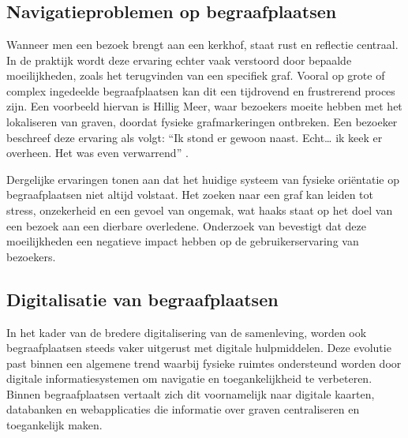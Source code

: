 \chapter{}%
\label{ch:stand-van-zaken}



\section{Navigatieproblemen op begraafplaatsen}

Wanneer men een bezoek brengt aan een kerkhof, staat rust en reflectie centraal. In de praktijk wordt deze ervaring echter vaak verstoord door bepaalde moeilijkheden, zoals het terugvinden van een specifiek graf. Vooral op grote of complex ingedeelde begraafplaatsen kan dit een tijdrovend en frustrerend proces zijn. Een voorbeeld hiervan is Hillig Meer, waar bezoekers moeite hebben met het lokaliseren van graven, doordat fysieke grafmarkeringen ontbreken. Een bezoeker beschreef deze ervaring als volgt: “Ik stond er gewoon naast. Echt… ik keek er overheen. Het was even verwarrend” \autocite{Meer2025}.

Dergelijke ervaringen tonen aan dat het huidige systeem van fysieke oriëntatie op begraafplaatsen niet altijd volstaat. Het zoeken naar een graf kan leiden tot stress, onzekerheid en een gevoel van ongemak, wat haaks staat op het doel van een bezoek aan een dierbare overledene. Onderzoek van \Autocite{Haekkilae2022} bevestigt dat deze moeilijkheden een negatieve impact hebben op de gebruikerservaring van bezoekers.

\section{Digitalisatie van begraafplaatsen}

In het kader van de bredere digitalisering van de samenleving, worden ook begraafplaatsen steeds vaker uitgerust met digitale hulpmiddelen. Deze evolutie past binnen een algemene trend waarbij fysieke ruimtes ondersteund worden door digitale informatiesystemen om navigatie en toegankelijkheid te verbeteren. Binnen begraafplaatsen vertaalt zich dit voornamelijk naar digitale kaarten, databanken en webapplicaties die informatie over graven centraliseren en toegankelijk maken.

